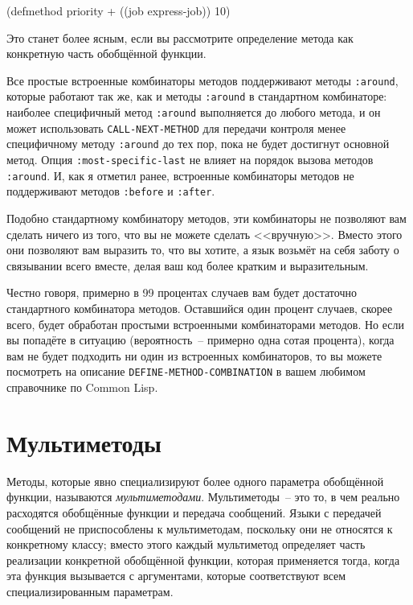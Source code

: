 \begin{myverb}
(defmethod priority + ((job express-job)) 10)
\end{myverb}

Это станет более ясным, если вы рассмотрите определение метода как конкретную часть
обобщённой функции.

Все простые встроенные комбинаторы методов поддерживают методы \lstinline{:around}, которые
работают так же, как и методы \lstinline{:around} в стандартном комбинаторе: наиболее специфичный
метод \lstinline{:around} выполняется до любого метода, и он может использовать
\lstinline{CALL-NEXT-METHOD} для передачи контроля менее специфичному методу \lstinline{:around} до
тех пор, пока не будет достигнут основной метод.  Опция \lstinline{:most-specific-last} не
влияет на порядок вызова методов \lstinline{:around}.  И, как я отметил ранее, встроенные
комбинаторы методов не поддерживают методов \lstinline{:before} и \lstinline{:after}.

Подобно стандартному комбинатору методов, эти комбинаторы не позволяют вам сделать ничего
из того, что вы не можете сделать <<вручную>>.  Вместо этого они позволяют вам выразить то,
что вы хотите, а язык возьмёт на себя заботу о связывании всего вместе, делая ваш код
более кратким и выразительным.

Честно говоря, примерно в 99 процентах случаев вам будет достаточно стандартного
комбинатора методов.  Оставшийся один процент случаев, скорее всего, будет обработан
простыми встроенными комбинаторами методов.  Но если вы попадёте в ситуацию
(вероятность~-- примерно одна сотая процента), когда вам не будет подходить ни один из
встроенных комбинаторов, то вы можете посмотреть на описание
\lstinline{DEFINE-METHOD-COMBINATION} в вашем любимом справочнике по Common Lisp.

\section{Мультиметоды}

Методы, которые явно специализируют более одного параметра обобщённой функции, называются
\textit{мультиметодами}.  Мультиметоды~-- это то, в чем реально расходятся обобщённые
функции и передача сообщений.  Языки с передачей сообщений не приспособлены к
мультиметодам, поскольку они не относятся к конкретному классу; вмес\-то этого каждый
мультиметод определяет часть реализации конкретной обобщённой функции, которая применяется
тогда, когда эта функция вызывается с аргументами, которые соответствуют всем
специализированным параметрам.

